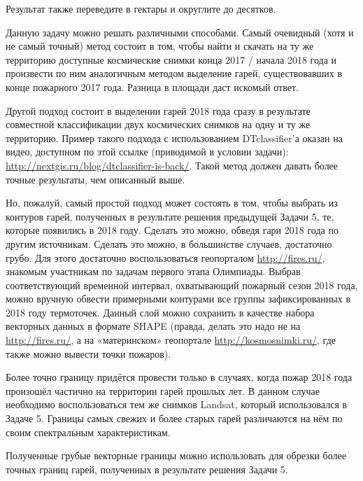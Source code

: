 Результат также переведите в гектары и округлите до десятков.

\explanationSection

Данную задачу можно решать различными способами. Самый очевидный (хотя и не самый точный) метод состоит в том, чтобы найти и скачать на ту же территорию доступные космические снимки конца 2017 / начала 2018 года и произвести по ним аналогичным методом выделение гарей, существовавших в конце пожарного 2017 года. Разница в площади даст искомый ответ.

Другой подход состоит в выделении гарей 2018 года сразу в результате совместной классификации двух космических снимков на одну и ту же территорию. Пример такого подхода с использованием DTclassifier’а оказан на видео, доступном по этой ссылке (приводимой в условии задачи): \url{http://nextgis.ru/blog/dtclassifier-is-back/}. Такой метод должен давать более точные результаты, чем описанный выше.

Но, пожалуй, самый простой подход может состоять в том, чтобы выбрать из контуров гарей, полученных в результате решения предыдущей Задачи 5, те, которые появились в 2018 году. Сделать это можно, обведя гари 2018 года по другим источникам. Сделать это можно, в большинстве случаев, достаточно грубо. Для этого достаточно воспользоваться геопорталом \url{http://fires.ru/}, знакомым участникам по задачам первого этапа Олимпиады. Выбрав соответствующий временной интервал, охватывающий пожарный сезон 2018 года, можно вручную обвести примерными контурами все группы зафиксированных в 2018 году термоточек. Данный слой можно сохранить в качестве набора векторных данных в формате SHAPE (правда, делать это надо не на \url{http://fires.ru/}, а на «материнском» геопортале \url{http://kosmosnimki.ru/}, где также можно вывести точки пожаров).

Более точно границу придётся провести только в случаях, когда пожар 2018 года произошёл частично на территории гарей прошлых лет. В данном случае необходимо воспользоваться тем же снимков Landsat, который использовался в Задаче 5. Границы самых свежих и более старых гарей различаются на нём по своим спектральным характеристикам.

Полученные грубые векторные границы можно использовать для обрезки более точных границ гарей, полученных в результате решения Задачи 5.

